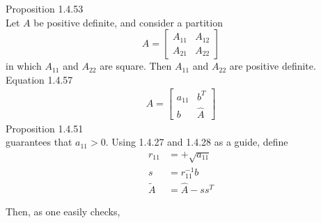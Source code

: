 \documentclass{article}
\begin{document}
	Proposition 1.4.53\\
	Let $A$ be positive definite, and consider a partition 
	$$A = \begin{bmatrix}	A_{11}&A_{12}\\A_{21}&A_{22}\end{bmatrix}$$ in which $A_{11}$ and $A_{22}$ are square. Then $A_{11}$ and $A_{22}$ are positive definite. 
	\\
	Equation 1.4.57\\
	\begin{align*}
		A = \begin{bmatrix}a_{11}&b^T\\b&\hat{A}\end{bmatrix}
	\end{align*}
	Proposition 1.4.51\\
	guarantees that $a_{11} > 0$. Using 1.4.27 and 1.4.28 as a guide, define 
	\begin{align*}
	r_{11} &= +\sqrt{a_{11}}\\
	s &= r_{11}^{-1}b\\ 
	\tilde{A} &= \hat{A}-ss^T
	\end{align*}
	
	Then, as one easily checks, 
	
\end{document}
